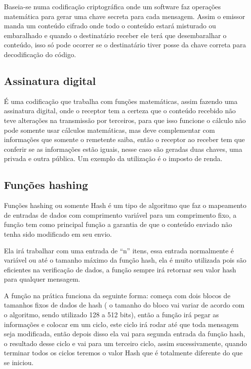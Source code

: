 \par Baseia-se numa codificação criptográfica onde um software faz operações matemática para gerar uma chave secreta para cada mensagem. Assim o emissor manda um conteúdo cifrado onde todo o conteúdo estará misturado ou embaralhado e quando o destinatário receber ele terá que desembaralhar o conteúdo, isso só pode ocorrer se o destinatário tiver posse da chave correta para decodificação do código.

\subsection{\textbf{Assinatura digital}}

\par É uma codificação que trabalha com funções matemáticas, assim fazendo uma assinatura digital, onde o receptor tem a certeza que o conteúdo recebido não teve alterações na transmissão por terceiros, para que isso funcione o cálculo não pode somente usar cálculos matemáticas, mas deve complementar com informações que somente o remetente saiba, então o receptor ao receber tem que conferir se as informações estão iguais, nesse caso são geradas duas chaves, uma privada e outra pública. Um exemplo da utilização é o imposto de renda.

\newpage
\subsection{\textbf{Funções hashing}}

\par Funções hashing ou somente Hash é um tipo de algoritmo que faz o mapeamento de entradas de dados com comprimento variável para um comprimento fixo, a função tem como principal função a garantia de que o conteúdo enviado não tenha sido modificado em seu envio.

\par Ela irá trabalhar com uma entrada de “n” itens, essa entrada normalmente é variável ou até o tamanho máximo da função hash, ela é muito utilizada pois são eficientes na verificação de dados, a função sempre irá retornar seu valor hash para qualquer mensagem.

\par A função na prática funciona da seguinte forma: começa com dois blocos de tamanhos fixos de dados de hash ( o tamanho do bloco vai variar de acordo com o algoritmo, sendo utilizado 128 a 512 bits), então a função irá pegar as informações e colocar em um ciclo, este ciclo irá rodar até que toda mensagem seja modificada, então depois disso ela vai para segunda entrada da função hash, o resultado desse ciclo e vai para um terceiro ciclo, assim sucessivamente, quando terminar todos os ciclos teremos o valor Hash que é totalmente diferente do que se iniciou.

